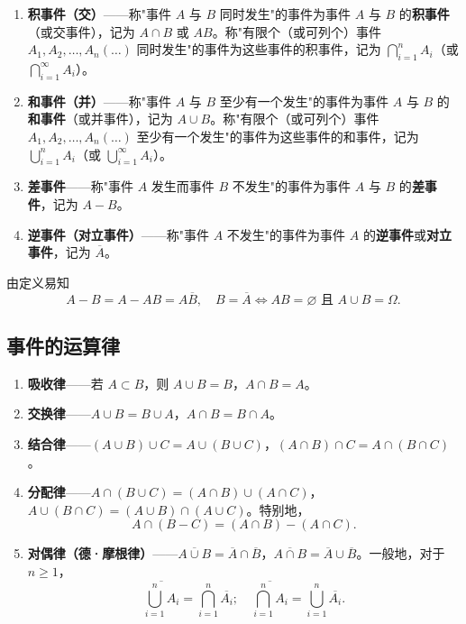﻿\documentclass[lang=cn,11pt]{elegantbook}
\begin{document}
\begin{enumerate}
    \item \textbf{积事件（交）}——称"事件 \(A\) 与 \(B\) 同时发生"的事件为事件 \(A\) 与 \(B\) 的\textbf{积事件}（或交事件），记为 \(A \cap B\) 或 \(AB\)。称"有限个（或可列个）事件 \(A_1, A_2, \dots, A_n(\dots)\) 同时发生"的事件为这些事件的积事件，记为 \(\bigcap_{i=1}^{n} A_i\)（或 \(\bigcap_{i=1}^{\infty} A_i\)）。
    \item \textbf{和事件（并）}——称"事件 \(A\) 与 \(B\) 至少有一个发生"的事件为事件 \(A\) 与 \(B\) 的\textbf{和事件}（或并事件），记为 \(A \cup B\)。称"有限个（或可列个）事件 \(A_1, A_2, \dots, A_n(\dots)\) 至少有一个发生"的事件为这些事件的和事件，记为 \(\bigcup_{i=1}^{n} A_i\)（或 \(\bigcup_{i=1}^{\infty} A_i\)）。
    \item \textbf{差事件}——称"事件 \(A\) 发生而事件 \(B\) 不发生"的事件为事件 \(A\) 与 \(B\) 的\textbf{差事件}，记为 \(A - B\)。
    \item \textbf{逆事件（对立事件）}——称"事件 \(A\) 不发生"的事件为事件 \(A\) 的\textbf{逆事件}或\textbf{对立事件}，记为 \(\overline{A}\)。
\end{enumerate}

由定义易知
\[
A - B = A - AB = A\overline{B}, \quad B = \overline{A} \Leftrightarrow AB = \varnothing \text{ 且 } A \cup B = \Omega.
\]

\subsection{事件的运算律}

\begin{enumerate}
    \item \textbf{吸收律}——若 \(A \subset B\)，则 \(A \cup B = B\)，\(A \cap B = A\)。
    \item \textbf{交换律}——\(A \cup B = B \cup A\)，\(A \cap B = B \cap A\)。
    \item \textbf{结合律}——\((A \cup B) \cup C = A \cup (B \cup C)\)，\((A \cap B) \cap C = A \cap (B \cap C)\)。
    \item \textbf{分配律}——\(A \cap (B \cup C) = (A \cap B) \cup (A \cap C)\)，\(A \cup (B \cap C) = (A \cup B) \cap (A \cup C)\)。特别地，
    \[
    A \cap (B - C) = (A \cap B) - (A \cap C).
    \]
    \item \textbf{对偶律（德·摩根律）}——\(\overline{A \cup B} = \overline{A} \cap \overline{B}\)，\(\overline{A \cap B} = \overline{A} \cup \overline{B}\)。一般地，对于 \(n \ge 1\)，
    \[
    \overline{\bigcup_{i=1}^{n} A_i} = \bigcap_{i=1}^{n} \overline{A_i}; \quad \overline{\bigcap_{i=1}^{n} A_i} = \bigcup_{i=1}^{n} \overline{A_i}.
    \]
\end{enumerate}
\end{document}
